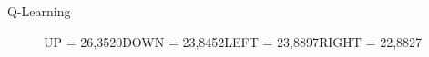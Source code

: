\documentclass{beamer}
\begin{document}
\begin{frame}{Q-Learning}
\begin{figure}[hp]
  			\caption*{\newline UP = 97,6530\newline DOWN = 100,0000\newline LEFT = 93,8538\newline RIGHT = 92,5261}\label{fig:fb}
		\endminipage\hfill
   			\caption*{\newline UP = 26,3520\newline DOWN = 23,8452\newline LEFT = 23,8897\newline RIGHT = 22,8827}\label{fig:fc}
		\endminipage
	\end{figure}
\end{frame}
\end{document}
